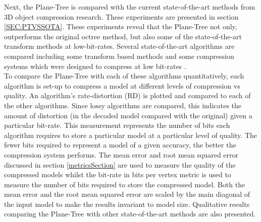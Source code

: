 Next, the Plane-Tree is compared with the current state-of-the-art methods from 3D object compression research. These experiments are presented in section \ref{SEC:PTVSSOTA}. These experiments reveal that the Plane-Tree not only, outperforms the original octree method, but also some of the state-of-the-art transform methods at low-bit-rates. Several state-of-the-art algorithms are compared including some transform based methods \cite{Bayazit103DMesh,Khodakovsky00Progressive} and some compression systems which were designed to compress at low bit-rates \cite{Peng10Feature,Lincoln13Hons}. \\ 

To compare the Plane-Tree with each of these algorithms quantitatively, each algorithm is set-up to compress a model at different levels of compression vs quality. An algorithm's rate-distortion (RD) is plotted and compared to each of the other algorithms. Since lossy algorithms are compared, this indicates the amount of distortion (in the decoded model compared with the original) given a particular bit-rate. This measurement represents the number of bits each algorithm requires to store a particular model at a particular level of quality. The fewer bits required to represent a model of a given accuracy, the better the compression system performs. The mean error and root mean squared error discussed in section \ref{metricsSection} are used to measure the quality of the compressed models whilst the bit-rate in bits per vertex metric is used to measure the number of bits required to store the compressed model. Both the mean error and the root mean squared error are scaled by the main diagonal of the input model to make the results invariant to model size. Qualitative results comparing the Plane-Tree with other state-of-the-art methods are also presented. \\

